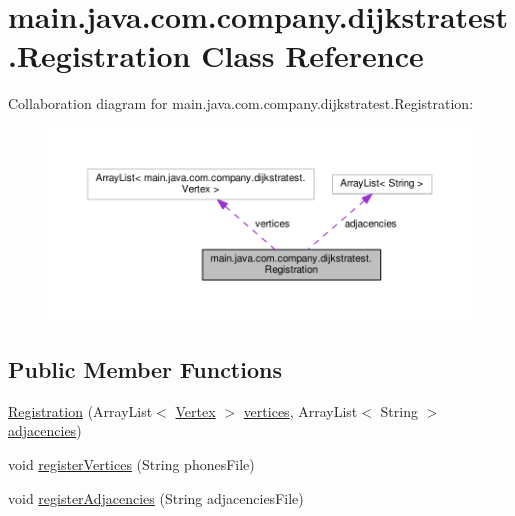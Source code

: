 \hypertarget{classmain_1_1java_1_1com_1_1company_1_1dijkstratest_1_1_registration}{\section{main.\-java.\-com.\-company.\-dijkstratest.\-Registration Class Reference}
\label{classmain_1_1java_1_1com_1_1company_1_1dijkstratest_1_1_registration}
}


Collaboration diagram for main.\-java.\-com.\-company.\-dijkstratest.\-Registration\-:
\nopagebreak
\begin{figure}[H]
\begin{center}
\leavevmode
\includegraphics[width=350pt]{classmain_1_1java_1_1com_1_1company_1_1dijkstratest_1_1_registration__coll__graph}
\end{center}
\end{figure}
\subsection*{Public Member Functions}
\begin{DoxyCompactItemize}
\item 
\hyperlink{classmain_1_1java_1_1com_1_1company_1_1dijkstratest_1_1_registration_a0139c70aa03637c99ffbae2142572aba}{Registration} (Array\-List$<$ \hyperlink{classmain_1_1java_1_1com_1_1company_1_1dijkstratest_1_1_vertex}{Vertex} $>$ \hyperlink{classmain_1_1java_1_1com_1_1company_1_1dijkstratest_1_1_registration_aacd4ad524e3c3d2d3e163ba14dc5e5d4}{vertices}, Array\-List$<$ String $>$ \hyperlink{classmain_1_1java_1_1com_1_1company_1_1dijkstratest_1_1_registration_a7a40c90a5de4173de7d70214b1c22700}{adjacencies})
\item 
void \hyperlink{classmain_1_1java_1_1com_1_1company_1_1dijkstratest_1_1_registration_adc93e97fd7f83981bad275bd013f3cc6}{register\-Vertices} (String phones\-File)
\item 
void \hyperlink{classmain_1_1java_1_1com_1_1company_1_1dijkstratest_1_1_registration_a1ce9fa88223cb28f8bd0e1052cadfe95}{register\-Adjacencies} (String adjacencies\-File)
\end{DoxyCompactItemize}
